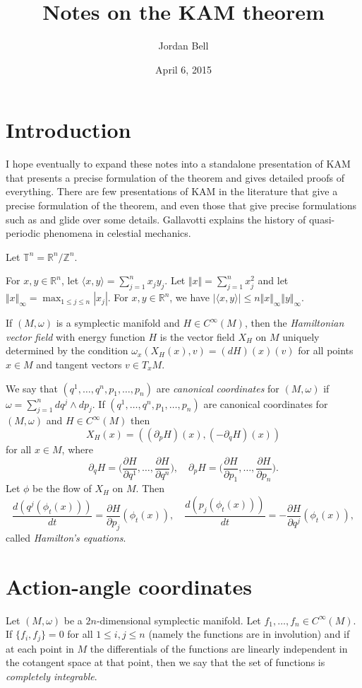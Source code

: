\documentclass{article}
\newcommand{\norm}[1]{\Vert #1 \Vert}
\begin{document}
\title{Notes on the KAM theorem}
\author{Jordan Bell}
\date{April 6, 2015}              

\maketitle

\section{Introduction}
I hope eventually to expand these notes into a standalone presentation of KAM that presents a precise formulation of the theorem and gives detailed proofs of everything. There are few presentations of KAM in the literature that
give a precise formulation of the theorem, and even those that give precise
formulations such as \cite{MR2026200} and \cite{poeschel} glide over
some details. Gallavotti \cite{gallavotti} explains the history of quasi-periodic phenomena in celestial mechanics.

Let $\mathbb{T}^n=\mathbb{R}^n/\mathbb{Z}^n$.

For $x,y \in \mathbb{R}^n$, let $\langle x,y \rangle = \sum_{j=1}^n x_j y_j$.
Let $\norm{x}=\sum_{j=1}^n x_j^2$ and let $\norm{x}_\infty=\max_{1 \leq j \leq n} |x_j|$. For $x,y \in \mathbb{R}^n$, we have $|\langle x,y \rangle|
\leq n \norm{x}_\infty \norm{y}_\infty$.

If $(M,\omega)$ is a symplectic manifold and $H \in C^\infty(M)$, then the
{\em Hamiltonian vector field} with energy function $H$ is the vector
field $X_H$ on $M$ uniquely determined by the condition $\omega_x (X_H(x),v)=(dH)(x)(v)$ for all points $x \in M$ and tangent vectors $v \in T_x M$.

We say that $(q^1,\ldots,q^n,p_1,\ldots,p_n)$ are {\em canonical coordinates}
for $(M,\omega)$ if $\omega=\sum_{j=1}^n dq^j \wedge dp_j$. If
$(q^1,\ldots,q^n,p_1,\ldots,p_n)$ are canonical coordinates for $(M,\omega)$
and $H \in C^\infty(M)$ then
\[
X_H(x)=((\partial_p H)(x),(-\partial_q H)(x))
\]
for all $x \in M$, where
\[
\partial_q H=\Big( \frac{\partial H}{\partial q^1},\ldots,\frac{\partial H}{\partial q^n} \Big), \quad \partial_p H=\Big( \frac{\partial H}{\partial p_1},\ldots,\frac{\partial H}{\partial p_n} \Big).
\]
Let $\phi$ be the flow of $X_H$ on $M$. Then
\[
\frac{d(q^j(\phi_t(x)))}{dt}=\frac{\partial H}{\partial p_j}(\phi_t(x)),
\quad \frac{d(p_j(\phi_t(x)))}{dt}=-\frac{\partial H}{\partial q^j}(\phi_t(x)),
\]
called {\em Hamilton's equations}.

\section{Action-angle coordinates}
Let $(M,\omega)$ be a $2n$-dimensional symplectic manifold. Let $f_1,\ldots,f_n \in C^\infty(M)$. If $\{f_i,f_j\}=0$ for all
$1 \leq i,j \leq n$ (namely the functions are in involution) and if at each point in $M$
the differentials of the functions are linearly
independent in the cotangent space at that point, then we say that
the set of functions is {\em completely integrable}.
\end{document}
